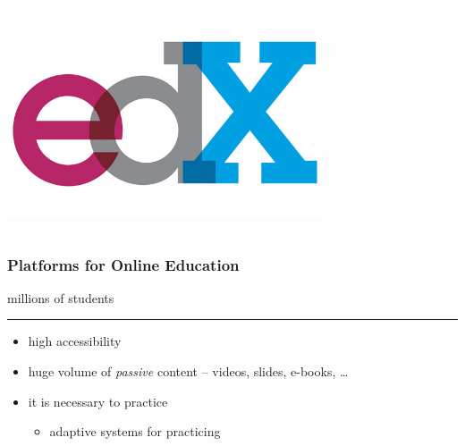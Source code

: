 \documentclass[xcolor=svgnames]{beamer}
\begin{document}
\begin{frame}
\begin{columns}[2]
\begin{center}
			\includegraphics[width=0.7\textwidth]{2013-VV041-student-modeling/edx.jpg}
		\end{center}
	\end{columns}
\end{frame}
\begin{frame}
	\frametitle{Platforms for Online Education}
	\begin{center}
		\Huge millions of students
	\end{center}

	\bigskip
	\hrule

	\medskip
	\begin{itemize}
		\item 	high accessibility
		\item 	huge volume of \textit{passive} content -- videos, slides, e-books, \ldots
		\item 	\alert{it is necessary to practice}
						\begin{itemize}
							\item 	adaptive systems for practicing
						\end{itemize}
	\end{itemize}
\end{frame}
\end{document}
